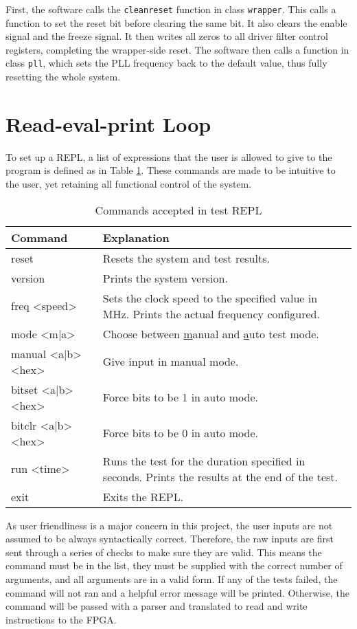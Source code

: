 First, the software calls the \texttt{cleanreset} function in class \texttt{wrapper}.
This calls a function to set the reset bit before clearing the same bit.
It also clears the enable signal and the freeze signal.
It then writes all zeros to all driver filter control registers, completing the wrapper-side reset.
The software then calls a function in class \texttt{pll}, which sets the PLL frequency back to the default value, thus fully resetting the whole system.

\section{Read-eval-print Loop}

To set up a REPL, a list of expressions that the user is allowed to give to the program is defined as in Table \ref{REPL Commands}.
These commands are made to be intuitive to the user, yet retaining all functional control of the system.

\begin{table}[H]
  \centering
  \begin{tabular}{|>{\ttfamily}p{11em}|p{\dimexpr\textwidth-18em}|}
    \hline
    \textrm{Command}   & Explanation \\
    \hline
    reset              & Resets the system and test results. \\
    version            & Prints the system version. \\
    freq <speed>       & Sets the clock speed to the specified value in MHz. Prints the actual frequency configured. \\
    mode <m|a>         & Choose between \underline{m}anual and \underline{a}uto test mode. \\
    manual <a|b> <hex> & Give input in manual mode. \\
    bitset <a|b> <hex> & Force bits to be 1 in auto mode. \\
    bitclr <a|b> <hex> & Force bits to be 0 in auto mode. \\
    run <time>         & Runs the test for the duration specified in seconds. Prints the results at the end of the test. \\
    exit               & Exits the REPL. \\
    \hline
  \end{tabular}
  \caption{Commands accepted in test REPL}
  \label{REPL Commands}
\end{table}

As user friendliness is a major concern in this project, the user inputs are not assumed to be always syntactically correct.
Therefore, the raw inputs are first sent through a series of checks to make sure they are valid.
This means the command must be in the list, they must be supplied with the correct number of arguments, and all arguments are in a valid form.
If any of the tests failed, the command will not ran and a helpful error message will be printed.
Otherwise, the command will be passed with a parser and translated to read and write instructions to the FPGA.

